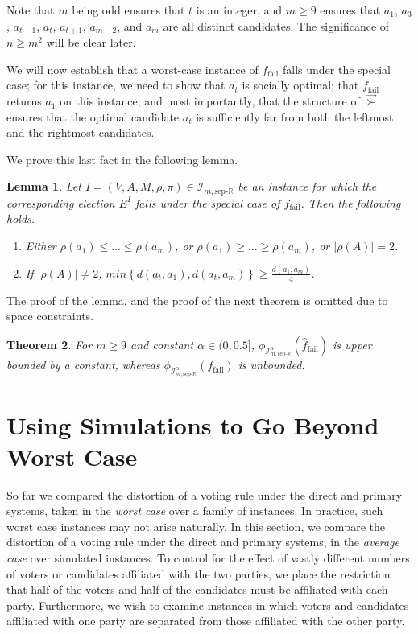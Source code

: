\documentclass[letterpaper]{article} %
\newtheorem{theorem}{Theorem}
\newtheorem{lemma}[theorem]{Lemma}
\theoremstyle{definition}
\newcommand{\set}[1]{\left\{#1\right\}}
\renewcommand{\vec}{\overrightarrow}
\renewcommand{\hat}{\widehat}
\newcommand{\bbR}{\mathbb{R}}
\newcommand{\calI}{\mathcal{I}}
\newcommand{\vsucc}{\vec{\succ}}
\newcommand{\sep}{\textrm{sep-}}
\newcommand{\eucline}{\bbR}
\newcommand{\euclinesep}{\sep\eucline}
\newcommand{\I}{\calI}
\newcommand{\fail}{{\textrm{fail}}}
\begin{document}
Note that $m$ being odd ensures that $t$ is an integer, and $m \ge 9$ ensures that $a_1$, $a_3$, $a_{t-1}$, $a_t$, $a_{t+1}$, $a_{m-2}$, and $a_m$ are all distinct candidates. The significance of $n \ge m^2$ will be clear later.

We will now establish that a worst-case instance of $f_\fail$ falls under the special case; for this instance, we need to show that $a_t$ is socially optimal; that $f_\fail$ returns $a_1$ on this instance; and most importantly, that the structure of $\vsucc$ ensures that the optimal candidate $a_t$ is sufficiently far from both the leftmost and the rightmost candidates.

We prove this last fact in the following lemma.

\begin{lemma}
	Let $I = (V,A,M,\rho,\pi) \in \I_{m,\euclinesep}$ be an instance for which the corresponding election $E^I$ falls under the special case of $f_\fail$. Then the following holds.
	\begin{enumerate}
		\item Either $\rho(a_1)\leq\ldots\leq\rho(a_{m})$, or $\rho(a_{1})\geq\ldots\geq\rho(a_{m})$, or $|\rho(A)|=2$.%
		\item If $|\rho(A)|\neq 2$, %
		$min\set{d(a_t,a_1),d(a_t,a_m)} \ge \frac{d(a_1,a_m)}{4}$.
	\end{enumerate}
	\label{lem:special-clause}
\end{lemma}

The proof of the lemma, and the proof of the next theorem is omitted due to space constraints.

\begin{theorem}
	For $m \ge 9$ and constant $\alpha \in (0,0.5]$, $\phi_{\I^{\alpha}_{m,\euclinesep}}(\hat{f}_\fail)$ is upper bounded by a constant, whereas $\phi_{\I^{\alpha}_{m,\euclinesep}}(f_\fail)$ is unbounded.
	\label{thm:primary-much-better}
\end{theorem}

\section{Using Simulations to Go Beyond Worst Case}

So far we compared the distortion of a voting rule under the direct and primary systems, taken in the \emph{worst case} over a family of instances. In practice, such worst case instances may not arise naturally. In this section, we compare the distortion of a voting rule under the direct and primary systems, in the \emph{average case} over simulated instances. To control for the effect of vastly different numbers of voters or candidates affiliated with the two parties, we place the restriction that half of the voters and half of the candidates must be affiliated with each party. Furthermore, we wish to examine instances in which voters and candidates affiliated with one party are separated from those affiliated with the other party.
\end{document}
